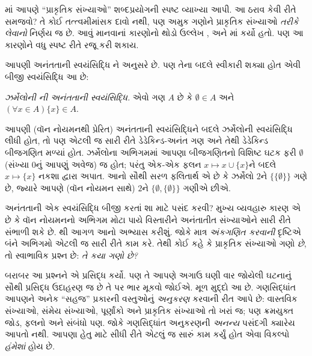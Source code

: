 \documentclass[../../../include/open-logic-section]{subfiles}
\begin{document}


માં આપણે “પ્રાકૃતિક સંખ્યાઓ”
શબ્દપ્રયોગની સ્પષ્ટ વ્યાખ્યા આપી. આ ઠરાવ કેવી રીતે સમજવો?
તે કોઈ તત્ત્વમીમાંસક દાવો નથી, પણ અમુક ગણોને પ્રાકૃતિક સંખ્યાઓ
\emph{તરીકે લેવાનો} નિર્ણય જ છે. આવું માનવાનાં કારણોનો થોડો
ઉલ્લેખ , 
અને માં કર્યો હતો.
પણ આ કારણોને વધુ સ્પષ્ટ રીતે રજૂ કરી શકાય.

આપણી અનંતતાની સ્વયંસિદ્ધિ \citet{VonNeumann1925}ને અનુસરે છે.
પણ તેના બદલે સ્વીકારી શક્યા હોત એવી બીજી સ્વયંસિદ્ધિ આ છે:

\begin{defish}
\emph{ઝર્મેલોની \citeyear{Zermelo1908Untersuchungen}ની અનંતતાની
સ્વયંસિદ્ધિ.} એવો ગણ $A$ છે કે $\emptyset \in A$ અને
$(\forall x \in A)\{x\} \in A$.
\end{defish}

આપણી (વૉન નોયમનથી પ્રેરિત) અનંતતાની સ્વયંસિદ્ધિને બદલે
ઝર્મેલોની સ્વયંસિદ્ધિ લીધી હોત, તો પણ એટલી જ સારી રીતે
ડેડેકિન્ડ-અનંત ગણ અને તેથી ડેડેકિન્ડ બીજગણિત મળ્યાં હોત.
ઝર્મેલોના અભિગમમાં આપણા બીજગણિતનો વિશિષ્ટ ઘટક ફરી
$\emptyset$ (સંખ્યા $0$નું આપણું અવેજ) જ હોત; પરંતુ એક-એક
ફલન $x \mapsto x \cup \{x\}$ને બદલે
$x \mapsto \{x\}$ નકશા દ્વારા અપાત. આનો સૌથી સરળ
ફલિતાર્થ એ છે કે ઝર્મેલો $2$ને $\{\{\emptyset\}\}$ ગણે છે,
જ્યારે આપણે (વૉન નોયમન સાથે) $2$ને
$\{\emptyset, \{\emptyset\}\}$ ગણીએ છીએ.

અનંતતાની એક સ્વયંસિદ્ધિ બીજી કરતાં શા માટે પસંદ કરવી?
મુખ્ય વ્યવહારુ કારણ એ છે કે વૉન નોયમનનો અભિગમ મોટા પાયે
વિસ્તારીને અનંતાતીત સંખ્યાઓને સારી રીતે સંભાળી શકે છે.
થી આગળ આનો અભ્યાસ કરીશું.
જોકે માત્ર \emph{અંકગણિત કરવાની} દૃષ્ટિએ બંને અભિગમો
એટલી જ સારી રીતે કામ કરે. તેથી કોઈ કહે કે પ્રાકૃતિક
સંખ્યાઓ ગણો \emph{છે}, તો સ્વાભાવિક પ્રશ્ન છે:
\emph{તે કયા ગણો છે?}

બરાબર આ પ્રશ્નને \citet{Benacerraf1965}એ પ્રસિદ્ધ કર્યો.
પણ તે આપણે અગાઉ ઘણી વાર જોયેલી ઘટનાનું સૌથી પ્રસિદ્ધ
ઉદાહરણ જ છે તે પર ભાર મૂકવો જોઈએ. મૂળ મુદ્દો આ છે.
ગણસિદ્ધાંત આપણને અનેક “સહજ” પ્રકારની વસ્તુઓનું
\emph{અનુકરણ} કરવાની રીત આપે છે: વાસ્તવિક સંખ્યાઓ,
સંમેય સંખ્યાઓ, પૂર્ણાંકો અને પ્રાકૃતિક સંખ્યાઓ તો ખરાં
જ; પણ ક્રમયુક્ત જોડ, ફલનો અને સંબંધો પણ.
જોકે ગણસિદ્ધાંત અનુકરણની \emph{અનન્ય} પસંદગી ક્યારેય
આપતો નથી. આપણા હેતુ માટે સીધી રીતે એટલું જ સારું
કામ કર્યું હોત એવા વિકલ્પો \emph{હંમેશાં} હોય છે.
\end{document}
